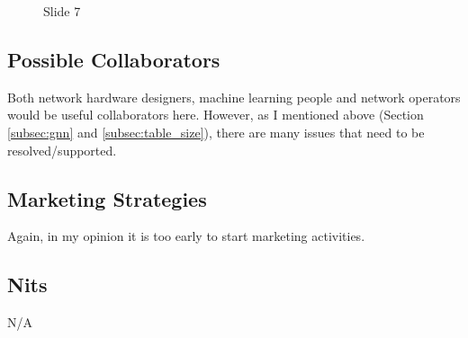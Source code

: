 \documentclass[11pt, oneside]{article}   	%
\begin{document}
\begin{figure}[h]
\caption{Slide 7}
\label{fig:slide7}
\end{figure}

\subsection{Possible Collaborators}
\label{slide6:possible_collaborators}
Both network hardware designers, machine learning people and network operators would be useful collaborators here. However, as I mentioned above 
(Section \ref{subsec:gnn} and \ref{subsec:table_size}), there are many issues that need to be resolved/supported.


\subsection{Marketing Strategies}
\label{slide6:marketing_strategies}
Again, in my opinion it is too early to start marketing activities.

\subsection{Nits}
\label{slide6:nits}
N/A
\end{document}
